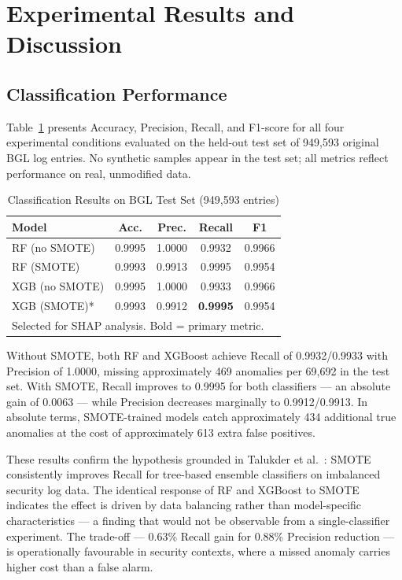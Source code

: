 \documentclass[conference]{IEEEtran}
\begin{document}
\section{Experimental Results and Discussion}
\label{sec:results}

\subsection{Classification Performance}

Table~\ref{tab:results} presents Accuracy, Precision, Recall, and F1-score
for all four experimental conditions evaluated on the held-out test set of
949{,}593 original BGL log entries. No synthetic samples appear in the test
set; all metrics reflect performance on real, unmodified data.

\begin{table}[h]
\caption{Classification Results on BGL Test Set (949{,}593 entries)}
\label{tab:results}
\centering
\small
\begin{tabular}{lcccc}
\toprule
\textbf{Model} & \textbf{Acc.} & \textbf{Prec.} & \textbf{Recall} & \textbf{F1} \\
\midrule
RF (no SMOTE)  & 0.9995 & 1.0000 & 0.9932 & 0.9966 \\
RF (SMOTE)     & 0.9993 & 0.9913 & 0.9995 & 0.9954 \\
XGB (no SMOTE) & 0.9995 & 1.0000 & 0.9933 & 0.9966 \\
XGB (SMOTE)*   & 0.9993 & 0.9912 & \textbf{0.9995} & 0.9954 \\
\midrule
\multicolumn{5}{l}{\footnotesize * Selected for SHAP analysis. Bold = primary metric.}\\
\bottomrule
\end{tabular}
\end{table}

Without SMOTE, both RF and XGBoost achieve Recall of 0.9932/0.9933 with
Precision of 1.0000, missing approximately 469 anomalies per 69{,}692 in
the test set. With SMOTE, Recall improves to 0.9995 for both classifiers
--- an absolute gain of 0.0063 --- while Precision decreases marginally to
0.9912/0.9913. In absolute terms, SMOTE-trained models catch approximately
434 additional true anomalies at the cost of approximately 613 extra false
positives.

These results confirm the hypothesis grounded in Talukder et al.\
\cite{talukder2024}: SMOTE consistently improves Recall for tree-based
ensemble classifiers on imbalanced security log data. The identical response
of RF and XGBoost to SMOTE indicates the effect is driven by data balancing
rather than model-specific characteristics --- a finding that would not be
observable from a single-classifier experiment. The trade-off --- 0.63\%
Recall gain for 0.88\% Precision reduction --- is operationally favourable
in security contexts, where a missed anomaly carries higher cost than a
false alarm.
\end{document}

